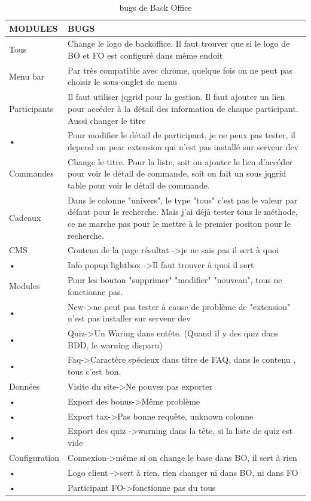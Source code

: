 \begin{table}[htbp]
\renewcommand{\tabularxcolumn}[1]{>{\arraybackslash}m{#1}}
\begin{tabularx}{\textwidth}{lX}
\hline 
MODULES & BUGS \\ 
\hline 
Tous
 & Change le logo de backoffice. Il faut trouver que si le logo de BO et FO est configuré dans même endoit
 \\ 
\hline 
Menu bar
 & Par très compatible avec chrome, quelque fois on ne peut pas choisir le sous-onglet de menu
 \\ 
\hline 
Participants
 & Il faut utiliser jqgrid pour la gestion. Il faut ajouter un lien pour accéder à la détail des information de chaque participant. Aussi changer le titre
 \\ 
\hline 
• & Pour modifier le détail de participant, je ne peux pas tester, il depend un pear extension qui n'est pas installé sur serveur dev
 \\ 
\hline 
Commandes
 & Change le titre. Pour la liste, soit on ajouter le lien d'accéder pour voir le détail de commande, soit on fait un sous jqgrid table pour voir le détail de commande.
 \\ 
\hline 
Cadeaux
 & Dans le colonne  "univers", le type "tous" c'est pas le valeur par défaut pour le recherche. Mais j'ai déjà tester tous le méthode, ce ne marche pas pour le mettre à le premier positon pour le recherche.
 \\ 
\hline 
CMS
 & Contenu de la page résultat -\textgreater je ne sais pas il sert à quoi
 \\ 
\hline 
• & Info popup lightbox -\textgreater Il faut trouver à quoi il  sert 
 \\ 
\hline 
Modules
 & Pour les bouton "supprimer" "modifier" "nouveau", tous ne fonctionne pas.
 \\ 
\hline 
• & New-\textgreater ne peut pas tester à cause de problème de "extension"  n'est pas installer sur serveur dev
 \\ 
\hline 
• & Quiz-\textgreater Un Waring dans entête.  (Quand il y des quiz dans BDD, le warning disparu)  
 \\ 
\hline 
• & Faq-\textgreater Caractère spécieux dans titre de FAQ, dans le contenu , tous c'est bon.   
 \\ 
\hline 
Données
 & Visite du site-\textgreater Ne pouvez pas exporter
 \\ 
\hline 
• & Export des bonus-\textgreater Même problème
 \\ 
\hline 
• & Export tax-\textgreater Pas bonne requête, unknown colonne
 \\ 
\hline 
• & Export des quiz -\textgreater warning dans la tête, si la liste de quiz est vide
 \\ 
\hline 
Configuration
 & Connexion-\textgreater même si on change le base dans BO, il sert à rien
 \\ 
\hline 
• & Logo client -\textgreater sert à rien, rien changer ni dans BO, ni dans FO
 \\ 
\hline 
• & Participant FO-\textgreater fonctionne pas du tous
 \\ 
\hline 
\end{tabularx} 
 \caption{bugs de Back Office}
\end{table}  


